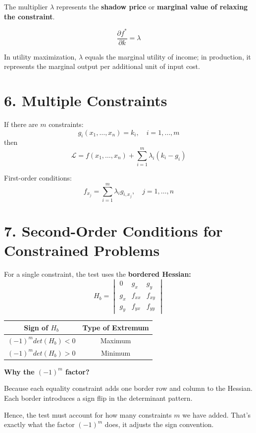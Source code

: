 \documentclass[12pt]{article}
\begin{document}
The multiplier $\lambda$ represents the \textbf{shadow price} or \textbf{marginal value of relaxing the constraint}.

\[
\frac{\partial f^*}{\partial k} = \lambda
\]

In utility maximization, $\lambda$ equals the marginal utility of income; in production, it represents the marginal output per additional unit of input cost.



\section*{6. Multiple Constraints}

If there are $m$ constraints:
\[
g_i(x_1,\ldots,x_n) = k_i, \quad i=1,\ldots,m
\]
then
\[
\mathcal{L} = f(x_1,\ldots,x_n) + \sum_{i=1}^m \lambda_i(k_i - g_i)
\]

First-order conditions:
\[
f_{x_j} = \sum_{i=1}^m \lambda_i g_{i,x_j}, \quad j = 1,\ldots,n
\]



\section*{7. Second-Order Conditions for Constrained Problems}

For a single constraint, the test uses the \textbf{bordered Hessian:}
\[
H_b =
\begin{vmatrix}
0 & g_x & g_y \\
g_x & f_{xx} & f_{xy} \\
g_y & f_{yx} & f_{yy}
\end{vmatrix}
\]

\begin{center}
\begin{tabular}{c|c}
\textbf{Sign of } $H_b$ & \textbf{Type of Extremum} \\ \hline
$(-1)^{m}det(H_b) < 0$ & Maximum \\
$(-1)^{m}det(H_b)> 0$ & Minimum
\end{tabular}
\end{center}

\textbf{Why the $(-1)^{m}$ factor?}

Because each equality constraint adds one border row and column to the Hessian.
Each border introduces a sign flip in the determinant pattern.

Hence, the test must account for how many constraints 
$m$ we have added.   That's exactly what the factor $(-1)^{m}$ does,  it adjusts the sign convention.
\end{document}
